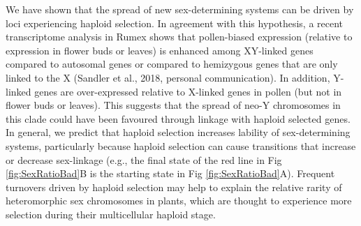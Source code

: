 \documentclass[10pt,letterpaper]{article}
\begin{document}
We have shown that the spread of new sex-determining systems can be driven by loci experiencing haploid selection. 
In agreement with this hypothesis, a recent transcriptome analysis in Rumex shows that pollen-biased expression (relative to expression in flower buds or leaves) is enhanced among XY-linked genes compared to autosomal genes or compared to hemizygous genes that are only linked to the X (Sandler et al., 2018, personal communication). 
In addition, Y-linked genes are over-expressed relative to X-linked genes in pollen (but not in flower buds or leaves). 
This suggests that the spread of neo-Y chromosomes in this clade could have been favoured through linkage with haploid selected genes. 
In general, we predict that haploid selection increases lability of sex-determining systems, particularly because haploid selection can cause transitions that increase or decrease sex-linkage (e.g., the final state of the red line in Fig \ref{fig:SexRatioBad}B is the starting state in Fig \ref{fig:SexRatioBad}A). 
Frequent turnovers driven by haploid selection may help to explain the relative rarity of heteromorphic sex chromosomes in plants, which are thought to experience more selection during their multicellular haploid stage.
\end{document}

